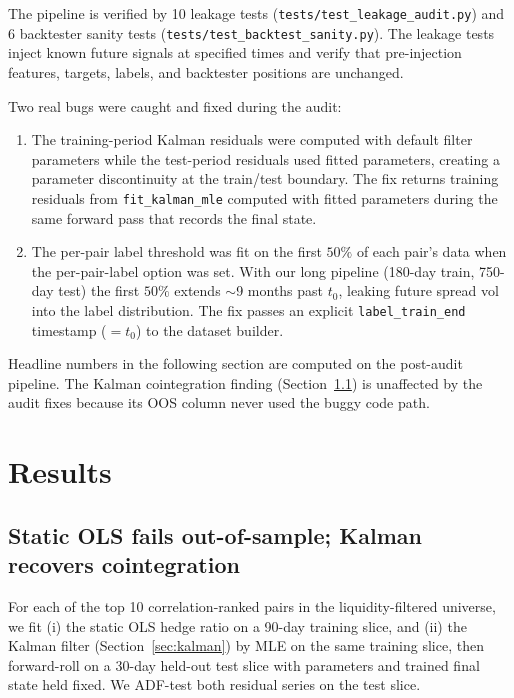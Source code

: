 \documentclass[11pt]{article}
\begin{document}
The pipeline is verified by 10 leakage tests
(\texttt{tests/test\_leakage\_audit.py}) and 6 backtester sanity tests
(\texttt{tests/test\_backtest\_sanity.py}). The leakage tests inject
known future signals at specified times and verify that pre-injection
features, targets, labels, and backtester positions are unchanged.

Two real bugs were caught and fixed during the audit:

\begin{enumerate}
    \item The training-period Kalman residuals were computed with
    default filter parameters while the test-period residuals used
    fitted parameters, creating a parameter discontinuity at the
    train/test boundary. The fix returns training residuals from
    \texttt{fit\_kalman\_mle} computed with fitted parameters during
    the same forward pass that records the final state.

    \item The per-pair label threshold was fit on the first $50\%$ of
    each pair's data when the per-pair-label option was set. With our
    long pipeline (180-day train, 750-day test) the first $50\%$
    extends $\sim$9 months past $t_0$, leaking future spread vol into
    the label distribution. The fix passes an explicit
    \texttt{label\_train\_end} timestamp ($= t_0$) to the dataset
    builder.
\end{enumerate}

Headline numbers in the following section are computed on the
post-audit pipeline. The Kalman cointegration finding
(Section~\ref{sec:finding1}) is unaffected by the audit fixes because
its OOS column never used the buggy code path.

\section{Results} \label{sec:results}

\subsection{Static OLS fails out-of-sample; Kalman recovers cointegration} \label{sec:finding1}

For each of the top 10 correlation-ranked pairs in the
liquidity-filtered universe, we fit (i) the static OLS hedge ratio on
a 90-day training slice, and (ii) the Kalman filter
(Section~\ref{sec:kalman}) by MLE on the same training slice, then
forward-roll on a 30-day held-out test slice with parameters and
trained final state held fixed. We ADF-test both residual series on
the test slice.
\end{document}
